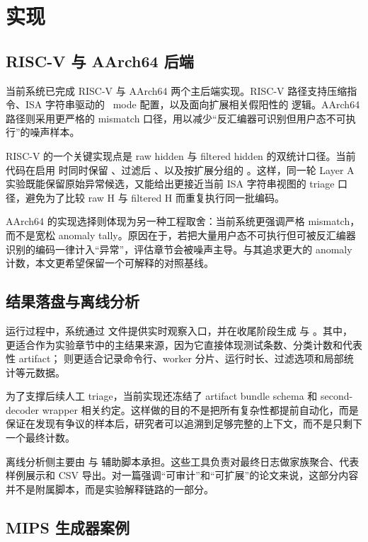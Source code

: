 \chapter{实现}

\section{RISC-V 与 AArch64 后端}

当前系统已完成 RISC-V 与 AArch64 两个主后端实现。RISC-V 路径支持压缩指令、ISA 字符串驱动的 \capstone\ mode 配置，以及面向扩展相关假阳性的  逻辑。AArch64 路径则采用更严格的 mismatch 口径，用以减少“反汇编器可识别但用户态不可执行”的噪声样本。

RISC-V 的一个关键实现点是 raw hidden 与 filtered hidden 的双统计口径。当前代码在启用  时同时保留 、过滤后 、以及按扩展分组的 。这样，同一轮 Layer A 实验既能保留原始异常候选，又能给出更接近当前 ISA 字符串视图的 triage 口径，避免为了比较 raw H 与 filtered H 而重复执行同一批编码。

AArch64 的实现选择则体现为另一种工程取舍：当前系统更强调严格 mismatch，而不是宽松 anomaly tally。原因在于，若把大量用户态不可执行但可被反汇编器识别的编码一律计入“异常”，评估章节会被噪声主导。与其追求更大的 anomaly 计数，本文更希望保留一个可解释的对照基线。

\section{结果落盘与离线分析}

运行过程中，系统通过  文件提供实时观察入口，并在收尾阶段生成  与 。其中， 更适合作为实验章节中的主结果来源，因为它直接体现测试条数、分类计数和代表性 artifact； 则更适合记录命令行、worker 分片、运行时长、过滤选项和局部统计等元数据。

为了支撑后续人工 triage，当前实现还冻结了 artifact bundle schema 和 second-decoder wrapper 相关约定。这样做的目的不是把所有复杂性都提前自动化，而是保证在发现有争议的样本后，研究者可以追溯到足够完整的上下文，而不是只剩下一个最终计数。

离线分析侧主要由  与  辅助脚本承担。这些工具负责对最终日志做家族聚合、代表样例展示和 CSV 导出。对一篇强调“可审计”和“可扩展”的论文来说，这部分内容并不是附属脚本，而是实验解释链路的一部分。

\section{MIPS 生成器案例}

